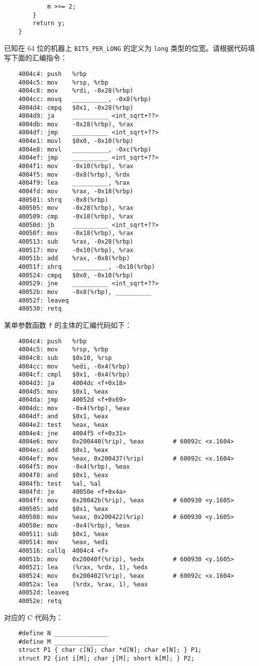 \begin{problems}
\begin{verbatim}
            m >>= 2; 
        } 
        return y; 
    } 
        \end{verbatim}
        已知在 64 位的机器上 \verb|BITS_PER_LONG| 的定义为 \verb|long| 类型的位宽。请根据代码填写下面的汇编指令：
        \begin{verbatim}
    4004c4: push   %rbp
    4004c5: mov    %rsp, %rbp
    4004c8: mov    %rdi, -0x28(%rbp)
    4004cc: movq   __________, -0x8(%rbp)
    4004d4: cmpq   $0x1, -0x28(%rbp)
    4004d9: ja     __________ <int_sqrt+??>
    4004db: mov    -0x28(%rbp), %rax
    4004df: jmp    __________ <int_sqrt+??>
    4004e1: movl   $0x0, -0x10(%rbp)
    4004e8: movl   __________, -0xc(%rbp)
    4004ef: jmp    __________ <int_sqrt+??>
    4004f1: mov    -0x10(%rbp), %rax
    4004f5: mov    -0x8(%rbp), %rdx
    4004f9: lea    __________, %rax
    4004fd: mov    %rax, -0x18(%rbp)
    400501: shrq   -0x8(%rbp)
    400505: mov    -0x28(%rbp), %rax
    400509: cmp    -0x18(%rbp), %rax
    40050d: jb     __________ <int_sqrt+??>
    40050f: mov    -0x18(%rbp), %rax
    400513: sub    %rax, -0x28(%rbp)
    400517: mov    -0x10(%rbp), %rax
    40051b: add    %rax, -0x8(%rbp)
    40051f: shrq   __________, -0x10(%rbp)
    400524: cmpq   $0x0, -0x10(%rbp)
    400529: jne    __________ <int_sqrt+??>
    40052b: mov    -0x8(%rbp), __________
    40052f: leaveq
    400530: retq
        \end{verbatim}
         某单参数函数 \verb|f| 的主体的汇编代码如下：
        \begin{verbatim}
    4004c4: push   %rbp
    4004c5: mov    %rsp, %rbp
    4004c8: sub    $0x10, %rsp
    4004cc: mov    %edi, -0x4(%rbp)
    4004cf: cmpl   $0x1, -0x4(%rbp)
    4004d3: ja     4004dc <f+0x18>
    4004d5: mov    $0x1, %eax
    4004da: jmp    40052d <f+0x69>
    4004dc: mov    -0x4(%rbp), %eax
    4004df: and    $0x1, %eax
    4004e2: test   %eax, %eax
    4004e4: jne    4004f5 <f+0x31>
    4004e6: mov    0x200440(%rip), %eax        # 60092c <x.1604>
    4004ec: add    $0x1, %eax
    4004ef: mov    %eax, 0x200437(%rip)        # 60092c <x.1604>
    4004f5: mov    -0x4(%rbp), %eax
    4004f8: and    $0x1, %eax
    4004fb: test   %al, %al
    4004fd: je     40050e <f+0x4a>
    4004ff: mov    0x20042b(%rip), %eax        # 600930 <y.1605>
    400505: add    $0x1, %eax
    400508: mov    %eax, 0x200422(%rip)        # 600930 <y.1605>
    40050e: mov    -0x4(%rbp), %eax
    400511: sub    $0x1, %eax
    400514: mov    %eax, %edi
    400516: callq  4004c4 <f>
    40051b: mov    0x20040f(%rip), %edx        # 600930 <y.1605>
    400521: lea    (%rax, %rdx, 1), %edx
    400524: mov    0x200402(%rip), %eax        # 60092c <x.1604>
    40052a: lea    (%rdx, %rax, 1), %eax
    40052d: leaveq
    40052e: retq
        \end{verbatim}
        对应的 C 代码为：
        \begin{verbatim}
    #define N _______________
    #define M _______________
    struct P1 { char c[N]; char *d[N]; char e[N]; } P1;
    struct P2 {int i[M]; char j[M]; short k[M]; } P2;
 

\end{verbatim}
\end{problems}

